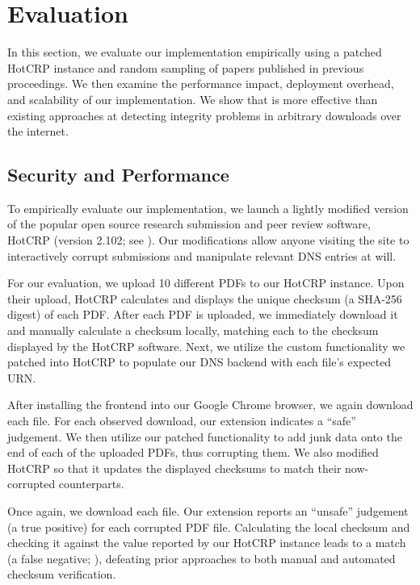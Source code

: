 \section{Evaluation} \label{sec:evaluation}

In this section, we evaluate our implementation empirically using a patched
HotCRP instance and random sampling of papers published in previous
\CONFERENCE{} proceedings. We then examine the performance impact, deployment
overhead, and scalability of our implementation. We show that \SYSTEM{} is more
effective than existing approaches at detecting integrity problems in arbitrary
downloads over the internet.

\subsection{Security and Performance}

To empirically evaluate our implementation, we launch a lightly modified version
of the popular open source research submission and peer review software, HotCRP
(version 2.102; see ). Our modifications allow anyone
visiting the site to interactively corrupt submissions and manipulate relevant
DNS entries at will.

For our evaluation, we upload 10 different \CONFERENCE{} PDFs to our HotCRP
instance. Upon their upload, HotCRP calculates and displays the unique checksum
(a SHA-256 digest) of each PDF. After each PDF is uploaded, we immediately
download it and manually calculate a checksum locally, matching each to the
checksum displayed by the HotCRP software. Next, we utilize the custom
functionality we patched into HotCRP to populate our DNS backend with each
file's expected URN.

After installing the frontend into our Google Chrome browser, we again download
each file. For each observed download, our extension indicates a ``safe''
judgement. We then utilize our patched functionality to add junk data onto the
end of each of the uploaded PDFs, thus corrupting them. We also modified HotCRP
so that it updates the displayed checksums to match their now-corrupted
counterparts.

Once again, we download each file. Our extension reports an ``unsafe'' judgement
(a true positive) for each corrupted PDF file. Calculating the local checksum
and checking it against the value reported by our HotCRP instance leads to a
match (a false negative; ), defeating prior
approaches to both manual and automated checksum verification.

